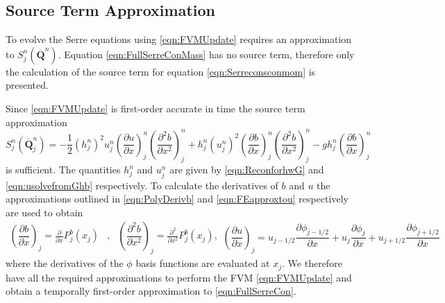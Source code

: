 \documentclass[times]{elsarticle}
\newcommand{\vecn}[1]{\boldsymbol{#1}}
\begin{document}
\subsection{Source Term Approximation}
To evolve the Serre equations using \eqref{eqn:FVMUpdate} requires an approximation to $S^n_j\left(\overline{\vecn{Q} }^{n} \right)$. Equation \eqref{eqn:FullSerreConMass} has no source term, therefore only the calculation of the source term for equation \eqref{eqn:Serreconsconmom} is presented.

Since \eqref{eqn:FVMUpdate} is first-order accurate in time the source term approximation
\begin{equation}
S^n_j\left(\overline{\vecn{Q} }^{n}_j \right)  = -\frac{1}{2}\left(h^n_j\right)^2 {u^n_j}\left( \frac{\partial {u}}{\partial x} \right)^n_j \left(\frac{\partial^2 b}{\partial x^2} \right)^n_j  + h^n_j \left(u^n_j\right)^2 \left(\frac{\partial b}{\partial x}\right)^n_j \left(\frac{\partial^2 b}{\partial x^2}\right)^n_j - gh^n_j\left(\frac{\partial b}{\partial x}\right)^n_j
\label{eqn:SourceTermNaive}
\end{equation}
is sufficient. The quantities $h^n_j$ and $u^n_j$ are given by \eqref{eqn:ReconforhwG} and \eqref{eqn:usolvefromGhb} respectively. To calculate the derivatives of $b$ and $u$ the approximations outlined in \eqref{eqn:PolyDerivb} and \eqref{eqn:FEapproxtou} respectively are used to obtain
\begin{subequations}
\begin{align*}
\left(\dfrac{\partial {b}}{\partial x} \right)_{j} = \frac{\partial }{\partial x}P^b_j(x_{j}) &,& 	
\left(\dfrac{\partial^2 {b}}{\partial x^2} \right)_{j} = \frac{\partial^2 }{\partial x^2}P^b_j(x_{j}),
\end{align*}
\begin{equation*}
\left(\dfrac{\partial {u}}{\partial x} \right)_{j} = u_{j-1/2}\frac{\partial \phi_{j-1/2}}{\partial x} + u_{j}\frac{\partial \phi_{j}}{\partial x} + u_{j+1/2}\frac{\partial \phi_{j+1/2}}{\partial x}
\end{equation*}
\end{subequations}
where the derivatives of the $\phi$ basis functions are evaluated at $x_j$. We therefore have all the required approximations to perform the FVM \eqref{eqn:FVMUpdate} and obtain a temporally first-order approximation to \eqref{eqn:FullSerreCon}.
\end{document}
